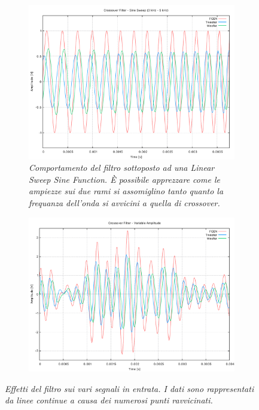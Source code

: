 \documentclass[12pt]{article}
\begin{document}
\begin{figure}[!ht]
  \begin{subfigure}{.5\textwidth}
    \centering
    \includegraphics[width=1\linewidth]{../results/CFSineSweep.pdf}
    \caption{\textit{Comportamento del filtro sottoposto ad una Linear Sweep Sine Function. È possibile apprezzare come le ampiezze sui due rami si assomiglino tanto quanto la frequanza dell'onda si avvicini a quella di crossover.}}
  \end{subfigure}%
  \hfill
  \begin{subfigure}{.5\textwidth}
    \centering
    \includegraphics[width=1\linewidth]{../results/CFAmplitudeMod.pdf}
    \caption*{}
  \end{subfigure}

  \caption{ \textit{Effetti del filtro sui vari segnali in entrata. 
  I dati sono rappresentati da linee continue a causa dei numerosi punti 
  ravvicinati.} }
\end{figure}
\newpage
\end{document}
